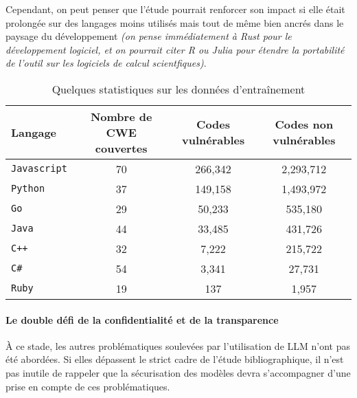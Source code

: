                     Cependant, on peut penser que l'étude pourrait renforcer son impact si elle
                    était prolongée sur des langages moins utilisés mais tout de même bien
                    ancrés dans le paysage du développement
                    \textit{(on pense immédiatement à Rust pour le développement logiciel, et on pourrait citer R ou Julia pour étendre la portabilité de l'outil sur les logiciels de calcul scientfiques)}.
                    \begin{table}[H]
                        \centering
                        \begin{tabular}{lccc}
                            \toprule
                            \textbf{Langage} & \textbf{Nombre de CWE couvertes} & \textbf{Codes vulnérables} & \textbf{Codes non vulnérables} \\
                            \midrule
                            \texttt{Javascript} & 70 & 266,342 & 2,293,712 \\
                            \texttt{Python} & 37 & 149,158 & 1,493,972 \\
                            \texttt{Go} & 29 & 50,233 & 535,180 \\
                            \texttt{Java} & 44 & 33,485 & 431,726 \\
                            \texttt{C++} & 32 & 7,222 & 215,722 \\
                            \texttt{C\#} & 54 & 3,341 & 27,731 \\
                            \texttt{Ruby} & 19 & 137 & 1,957 \\
                            \bottomrule
                        \end{tabular}
                        \caption{Quelques statistiques sur les données d'entraînement\cite{mainArticle}}
                    \end{table}
                \paragraph*{Le double défi de la confidentialité et de la transparence}
                    À ce stade, les autres problématiques soulevées par l'utilisation de LLM
                    n'ont pas été abordées. Si elles dépassent le strict cadre de l'étude
                    bibliographique, il n'est pas inutile de rappeler que la sécurisation des
                    modèles devra s'accompagner d'une prise en compte de ces problématiques.

